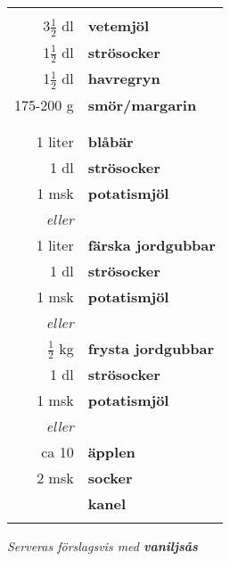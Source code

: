 \documentclass[a4paper,12pt]{article}
\newcommand{\tillb}[1]{\noindent \textit{Serveras förslagsvis med \textbf{#1}} \vspace{1cm}}
\begin{document}
\begin{table}[H]
	\begin{tabular}{rl}
	\hline
	&\\
		3$\frac{1}{2}$ dl & \textbf{vetemjöl}\\
		1$\frac{1}{2}$ dl & \textbf{strösocker}\\
		1$\frac{1}{2}$ dl & \textbf{havregryn}\\
		175-200 g & \textbf{smör/margarin}\\
		& \\
		\hline
		& \\
		1 liter & \textbf{blåbär}\\
		1 dl & \textbf{strösocker}\\
		1 msk & \textbf{potatismjöl}\\
		\textit{eller}& \\
		1 liter & \textbf{färska jordgubbar}\\
		1 dl & \textbf{strösocker}\\
		1 msk & \textbf{potatismjöl}\\
		\textit{eller}& \\
		$\frac{1}{2}$ kg & \textbf{frysta jordgubbar}\\
		1 dl & \textbf{strösocker}\\
		1 msk & \textbf{potatismjöl}\\
		\textit{eller}& \\
		ca 10 & \textbf{äpplen}\\
		2 msk & \textbf{socker}\\
		& \textbf{kanel} \\
	&\\
	\hline
	\end{tabular}
\end{table}

\tillb{vaniljsås}
\end{document}

